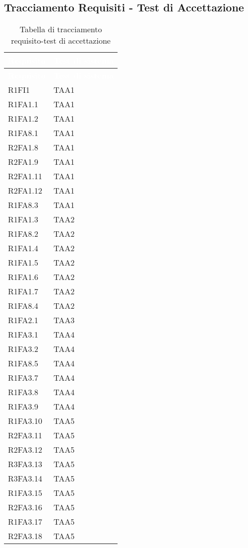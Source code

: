 \subsection{Tracciamento Requisiti - Test di Accettazione}
{
\renewcommand{\arraystretch}{1.5}
\centering
\begin{longtable}{C{4cm} C{4cm}}
\caption{Tabella di tracciamento requisito-test di accettazione}\\
\textcolor{white}{\textbf{Requisito}} & \textcolor{white}{\textbf{Test di sistema}}\\	
\endfirsthead
{}
\textcolor{white}{\textbf{Requisito}} & \textcolor{white}{\textbf{Test di sistema}}\\	
\endhead

R1FI1 & TAA1  \\
R1FA1.1 & TAA1  \\
R1FA1.2 & TAA1  \\
R1FA8.1 & TAA1  \\
R2FA1.8 & TAA1  \\
R2FA1.9 & TAA1  \\
R2FA1.11 & TAA1  \\ 
R2FA1.12 & TAA1  \\ 
R1FA8.3 & TAA1  \\

R1FA1.3 & TAA2  \\
R1FA8.2 & TAA2  \\
R1FA1.4 & TAA2  \\
R1FA1.5 & TAA2  \\
R1FA1.6 & TAA2  \\
R1FA1.7 & TAA2  \\
R1FA8.4 & TAA2  \\

R1FA2.1 & TAA3  \\

R1FA3.1 & TAA4  \\
R1FA3.2 & TAA4  \\
R1FA8.5 & TAA4  \\
R1FA3.7 & TAA4  \\
R1FA3.8 & TAA4  \\
R1FA3.9 & TAA4  \\

R1FA3.10 & TAA5  \\
R2FA3.11 & TAA5  \\
R2FA3.12 & TAA5  \\
R3FA3.13 & TAA5  \\
R3FA3.14 & TAA5  \\
R1FA3.15 & TAA5  \\
R2FA3.16 & TAA5  \\
R1FA3.17 & TAA5  \\
R2FA3.18 & TAA5  \\


\end{longtable}}
